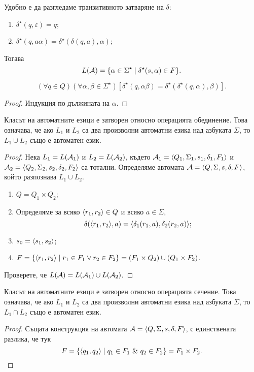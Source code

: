 Удобно е да разгледаме транзитивното затваряне на $\delta$:
\begin{enumerate}
\item 
  $\delta^\star(q,\varepsilon) = q$;
\item
  $\delta^\star(q,a\alpha) = \delta^\star(\delta(q,a),\alpha)$;
\end{enumerate}
Тогава \[L(\mathcal{A}) = \{\alpha\in\Sigma^\star \mid \delta^\star(s,\alpha) \in F\}.\]

\begin{prop}
  \[(\forall q\in Q)(\forall\alpha,\beta\in\Sigma^\star)[\delta^\star(q,\alpha\beta) = \delta^\star(\delta^\star(q,\alpha),\beta)].\]
\end{prop}
\begin{proof}
  Индукция по дължината на $\alpha$.
\end{proof}

\begin{thm}
  Класът на автоматните езици е затворен относно операцията обединение.
  Това означава, че ако $L_1$ и $L_2$ са два произволни автоматни езика над азбуката $\Sigma$, то $L_1\cup L_2$
  също е автоматен език.
\end{thm}
\begin{proof}
  Нека $L_1 = L(\mathcal{A}_1)$ и $L_2 = L(\mathcal{A}_2)$, 
  където $\mathcal{A}_1 = \langle{Q_1,\Sigma_1,s_1,\delta_1,F_1}\rangle$ и $\mathcal{A}_2 = \langle{Q_2,\Sigma_2,s_2,\delta_2,F_2}\rangle$ са тотални.
  Определяме автомата $\mathcal{A} = \langle{Q,\Sigma,s,\delta,F}\rangle$, който разпознава $L_1\cup L_2$.
  \begin{enumerate}[1)]
  \item
    $Q = Q_1\times Q_2$;
  \item
    Определяме за всяко $\langle{r_1,r_2}\rangle \in Q$ и всяко $a \in \Sigma$,
    \[\delta(\langle{r_1,r_2}\rangle,a) = \langle{\delta_1(r_1,a),\delta_2(r_2,a)}\rangle;\]
  \item
    $s_0 = \langle{s_1,s_2}\rangle$;
  \item
    $F = \{\langle{r_1,r_2}\rangle\mid r_1\in F_1\vee r_2 \in F_2\} = (F_1\times Q_2)\cup (Q_1\times F_2)$.
  \end{enumerate}
  Проверете, че $L(\mathcal{A}) = L(\mathcal{A}_1)\cup L(\mathcal{A}_2)$.
\end{proof}

\begin{cor}
  Класът на автоматните езици е затворен относно операцията сечение.
  Това означава, че ако $L_1$ и $L_2$ са два произволни автоматни езика над азбуката $\Sigma$, то $L_1\cap L_2$
  също е автоматен език.
\end{cor}
\begin{proof}
  Същата конструкция на автомата $\mathcal{A} = \langle{Q,\Sigma,s,\delta,F}\rangle$, 
  с единствената разлика, че тук 
  \[F = \{\pair{q_1,q_2} \mid q_1 \in F_1\ \&\ q_2 \in F_2\} = F_1\times F_2.\]
\end{proof}

